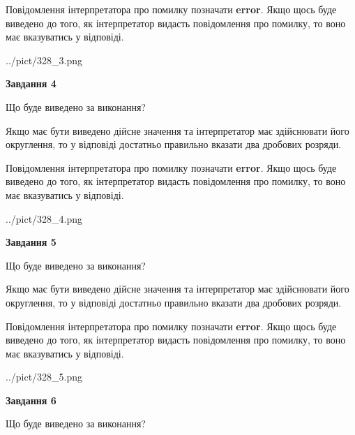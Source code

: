 \documentclass[12pt, ukrainian]{article}
\begin{document}
{\begin {Large}
Повідомлення інтерпретатора про помилку позначати \textbf{error}.
Якщо щось буде виведено до того, як інтерпретатор видасть повідомлення про помилку, 
то воно має вказуватись у відповіді. \par

\begin{center}
	{../pict/328_3.png}
\end{center}
\newpage

{\begin {center}\textbf{Завдання 4}\end {center}}\par
Що буде виведено за виконання? \par

Якщо має бути виведено дійсне значення та інтерпретатор має здійснювати його округлення, 
то у відповіді достатньо правильно вказати два дробових розряди.

Повідомлення інтерпретатора про помилку позначати \textbf{error}.
Якщо щось буде виведено до того, як інтерпретатор видасть повідомлення про помилку, 
то воно має вказуватись у відповіді. \par

\begin{center}
	{../pict/328_4.png}
\end{center}
\newpage

{\begin {center}\textbf{Завдання 5}\end {center}}\par
Що буде виведено за виконання? \par

Якщо має бути виведено дійсне значення та інтерпретатор має здійснювати його округлення, 
то у відповіді достатньо правильно вказати два дробових розряди.

Повідомлення інтерпретатора про помилку позначати \textbf{error}.
Якщо щось буде виведено до того, як інтерпретатор видасть повідомлення про помилку, 
то воно має вказуватись у відповіді. \par

\begin{center}
	{../pict/328_5.png}
\end{center}
\newpage

{\begin {center}\textbf{Завдання 6}\end {center}}\par
Що буде виведено за виконання? \par


\end{Large}}
\end{document}
